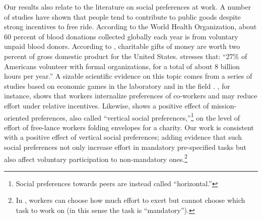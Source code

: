 \documentclass[12pt, titlepage]{article}
\begin{document}
Our results also relate to the literature on social preferences at work.
A number of studies have shown that people tend to contribute to public
goods despite strong incentives to free ride. According to the World
Health Organization, about 60 percent of blood donations collected
globally each year is from voluntary unpaid blood donors. According to
\citet{list2011market}, charitable gifts of money are worth two percent
of gross domestic product for the United States.
\citet{lacetera2014rewarding} stresses that: ``27\% of Americans
volunteer with formal organizations, for a total of about 8 billion
hours per year.'' A sizable scientific evidence on this topic comes from
a series of studies based on economic games in the laboratory
\citep[see][ for a review]{levitt2007laboratory} and in the field
\citep{bandiera2005social, dellavigna2016estimating}.
\citet{bandiera2005social}, for instance, shows that workers internalize
preferences of co-workers and may reduce effort under relative
incentives. Likewise, \citet{dellavigna2016estimating} shows a positive
effect of mission-oriented preferences, also called ``vertical social
preferences,''\footnote{Social preferences towards peers are instead
  called ``horizontal.''} on the level of effort of free-lance workers
folding envelopes for a charity. Our work is consistent with a positive
effect of vertical social preferences; adding evidence that such social
preferences not only increase effort in mandatory pre-specified tasks
but also affect voluntary participation to non-mandatory ones.\footnote{In
  \citet{dellavigna2016estimating}, workers can choose how much effort
  to exert but cannot choose which task to work on (in this sense the
  task is ``mandatory'').}
\end{document}
